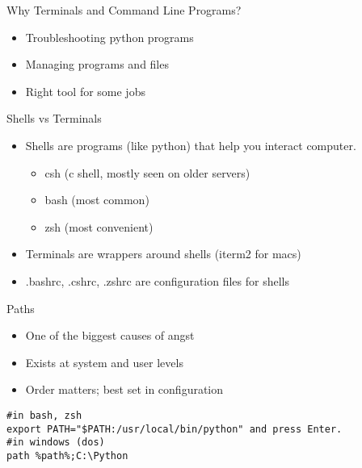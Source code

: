 \documentclass[presentation]{beamer}
\begin{document}
\begin{frame}[label=sec-3-0-2]{Why Terminals and Command Line Programs?}
\begin{itemize}
\item Troubleshooting python programs
\item Managing programs and files
\item Right tool for some jobs
\end{itemize}
\end{frame}


\begin{frame}[label=sec-3-0-3]{Shells vs Terminals}
\begin{itemize}
\item Shells are programs (like python) that help you interact computer.
\begin{itemize}
\item csh (c shell, mostly seen on older servers)
\item bash (most common)
\item zsh (most convenient)
\end{itemize}
\item Terminals are wrappers around shells (iterm2 for macs)
\item .bashrc, .cshrc, .zshrc are configuration files for shells
\end{itemize}
\end{frame}


\begin{frame}[fragile,label=sec-3-0-4]{Paths}
 \begin{itemize}
\item One of the biggest causes of angst
\item Exists at system and user levels
\item Order matters; best set in configuration
\end{itemize}
\lstset{numbers=left,language=sh,label= ,caption= }
\begin{lstlisting}
#in bash, zsh 
export PATH="$PATH:/usr/local/bin/python" and press Enter.
#in windows (dos)
path %path%;C:\Python
\end{lstlisting}
\end{frame}
\end{document}
